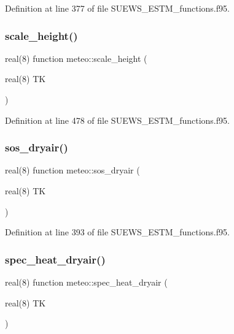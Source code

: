 Definition at line 377 of file S\+U\+E\+W\+S\+\_\+\+E\+S\+T\+M\+\_\+functions.\+f95.

\mbox{\label{namespacemeteo_ad07039dc16c44b421a37a93ec073d7ac}} 
\subsubsection{\texorpdfstring{scale\+\_\+height()}{scale\_height()}}
{\footnotesize\ttfamily real(8) function meteo\+::scale\+\_\+height (\begin{DoxyParamCaption}\item[{real(8)}]{TK }\end{DoxyParamCaption})}



Definition at line 478 of file S\+U\+E\+W\+S\+\_\+\+E\+S\+T\+M\+\_\+functions.\+f95.

\mbox{\label{namespacemeteo_a799c55d98d43606ee55dfcb2ed973c02}} 
\subsubsection{\texorpdfstring{sos\+\_\+dryair()}{sos\_dryair()}}
{\footnotesize\ttfamily real(8) function meteo\+::sos\+\_\+dryair (\begin{DoxyParamCaption}\item[{real(8)}]{TK }\end{DoxyParamCaption})}



Definition at line 393 of file S\+U\+E\+W\+S\+\_\+\+E\+S\+T\+M\+\_\+functions.\+f95.

\mbox{\label{namespacemeteo_a1db0e89d35e5eae20acb839111603927}} 
\subsubsection{\texorpdfstring{spec\+\_\+heat\+\_\+dryair()}{spec\_heat\_dryair()}}
{\footnotesize\ttfamily real(8) function meteo\+::spec\+\_\+heat\+\_\+dryair (\begin{DoxyParamCaption}\item[{real(8)}]{TK }\end{DoxyParamCaption})}



